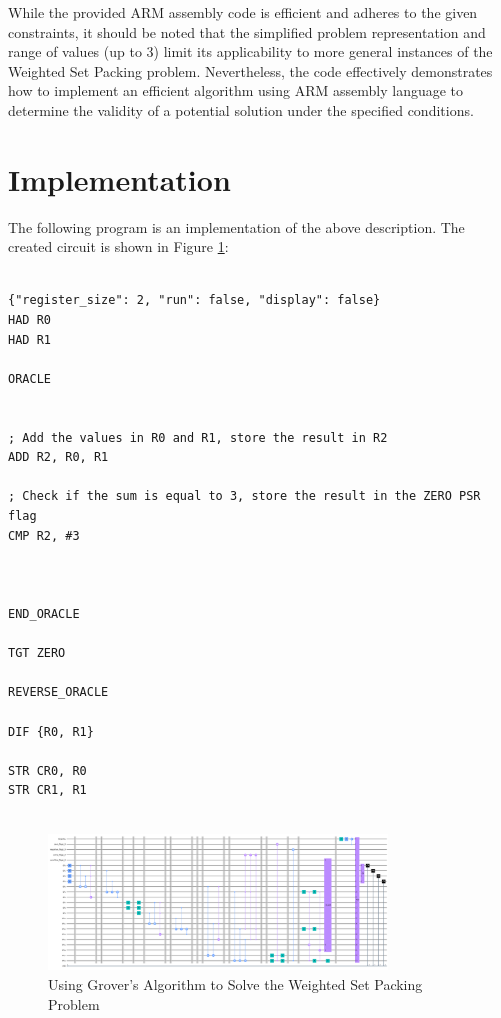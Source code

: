 While the provided ARM assembly code is efficient and adheres to the given constraints, it should be noted that the simplified problem representation and range of values (up to 3) limit its applicability to more general instances of the Weighted Set Packing problem. Nevertheless, the code effectively demonstrates how to implement an efficient algorithm using ARM assembly language to determine the validity of a potential solution under the specified conditions.



\section{Implementation}

The following program is an implementation of the above description. The created circuit is shown in Figure \ref{fig:Weighted_Set_Packing}:

\begin{lstlisting}

{"register_size": 2, "run": false, "display": false}
HAD R0
HAD R1

ORACLE


; Add the values in R0 and R1, store the result in R2
ADD R2, R0, R1

; Check if the sum is equal to 3, store the result in the ZERO PSR flag
CMP R2, #3



END_ORACLE

TGT ZERO

REVERSE_ORACLE

DIF {R0, R1}

STR CR0, R0
STR CR1, R1


\end{lstlisting}

\begin{figure}[htp]
    \centering
    \includegraphics[width=9cm]{Figures/Weighted_Set_Packing_circuit.png}
    \caption{Using Grover's Algorithm to Solve the Weighted Set Packing Problem}
    \label{fig:Weighted_Set_Packing}
\end{figure}


